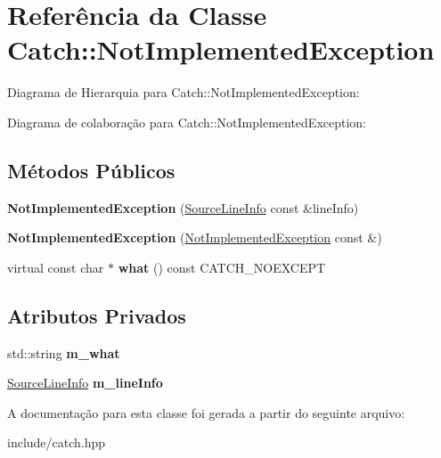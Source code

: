 \hypertarget{classCatch_1_1NotImplementedException}{}\section{Referência da Classe Catch\+:\+:Not\+Implemented\+Exception}
\label{classCatch_1_1NotImplementedException}


Diagrama de Hierarquia para Catch\+:\+:Not\+Implemented\+Exception\+:


Diagrama de colaboração para Catch\+:\+:Not\+Implemented\+Exception\+:
\subsection*{Métodos Públicos}
\begin{DoxyCompactItemize}
\item 
{\bfseries Not\+Implemented\+Exception} (\hyperlink{structCatch_1_1SourceLineInfo}{Source\+Line\+Info} const \&line\+Info)\hypertarget{classCatch_1_1NotImplementedException_ab4f0a5c39d8ffb72c664e2c07e180634}{}\label{classCatch_1_1NotImplementedException_ab4f0a5c39d8ffb72c664e2c07e180634}

\item 
{\bfseries Not\+Implemented\+Exception} (\hyperlink{classCatch_1_1NotImplementedException}{Not\+Implemented\+Exception} const \&)\hypertarget{classCatch_1_1NotImplementedException_a508a7a833455da2d3c10ea1a9d45e982}{}\label{classCatch_1_1NotImplementedException_a508a7a833455da2d3c10ea1a9d45e982}

\item 
virtual const char $\ast$ {\bfseries what} () const C\+A\+T\+C\+H\+\_\+\+N\+O\+E\+X\+C\+E\+PT\hypertarget{classCatch_1_1NotImplementedException_ad4c13963f1a8feacda0cd331adda89e3}{}\label{classCatch_1_1NotImplementedException_ad4c13963f1a8feacda0cd331adda89e3}

\end{DoxyCompactItemize}
\subsection*{Atributos Privados}
\begin{DoxyCompactItemize}
\item 
std\+::string {\bfseries m\+\_\+what}\hypertarget{classCatch_1_1NotImplementedException_a90c4faa85f9b7d9013961664057898d7}{}\label{classCatch_1_1NotImplementedException_a90c4faa85f9b7d9013961664057898d7}

\item 
\hyperlink{structCatch_1_1SourceLineInfo}{Source\+Line\+Info} {\bfseries m\+\_\+line\+Info}\hypertarget{classCatch_1_1NotImplementedException_a7bc9c1b628b820654eadb3b89da88169}{}\label{classCatch_1_1NotImplementedException_a7bc9c1b628b820654eadb3b89da88169}

\end{DoxyCompactItemize}


A documentação para esta classe foi gerada a partir do seguinte arquivo\+:\begin{DoxyCompactItemize}
\item 
include/catch.\+hpp\end{DoxyCompactItemize}
